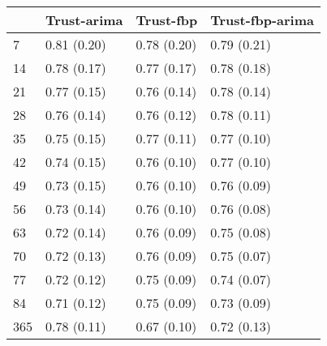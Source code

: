 \begin{tabular}{llll}
\toprule
{} &  Trust-arima &    Trust-fbp & Trust-fbp-arima \\
\midrule
7   &  0.81 (0.20) &  0.78 (0.20) &     0.79 (0.21) \\
14  &  0.78 (0.17) &  0.77 (0.17) &     0.78 (0.18) \\
21  &  0.77 (0.15) &  0.76 (0.14) &     0.78 (0.14) \\
28  &  0.76 (0.14) &  0.76 (0.12) &     0.78 (0.11) \\
35  &  0.75 (0.15) &  0.77 (0.11) &     0.77 (0.10) \\
42  &  0.74 (0.15) &  0.76 (0.10) &     0.77 (0.10) \\
49  &  0.73 (0.15) &  0.76 (0.10) &     0.76 (0.09) \\
56  &  0.73 (0.14) &  0.76 (0.10) &     0.76 (0.08) \\
63  &  0.72 (0.14) &  0.76 (0.09) &     0.75 (0.08) \\
70  &  0.72 (0.13) &  0.76 (0.09) &     0.75 (0.07) \\
77  &  0.72 (0.12) &  0.75 (0.09) &     0.74 (0.07) \\
84  &  0.71 (0.12) &  0.75 (0.09) &     0.73 (0.09) \\
365 &  0.78 (0.11) &  0.67 (0.10) &     0.72 (0.13) \\
\bottomrule
\end{tabular}

